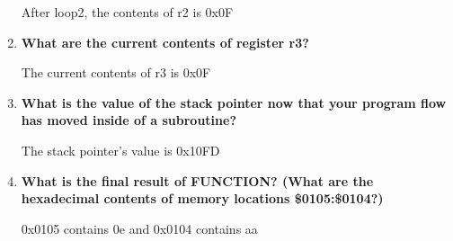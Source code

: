 \documentclass[12pt,letterpaper]{article}
\begin{document}
\begin{enumerate}
	After loop2, the contents of r2 is 0x0F
	
	
	\item 
\textbf{	What are the current contents of register r3? }
	
	The current contents of r3 is 0x0F 
	
	
	
	\item 
\textbf{	What is the value of the stack pointer now that your program flow has moved inside of a subroutine?}
	
	The stack pointer's value is 0x10FD
	
	
	
	\item 
\textbf{	What is the final result of FUNCTION? (What are the hexadecimal contents of memory locations \$0105:\$0104?)}
	
	 0x0105 contains 0e and 0x0104 contains aa


\end{enumerate}
\end{document}
